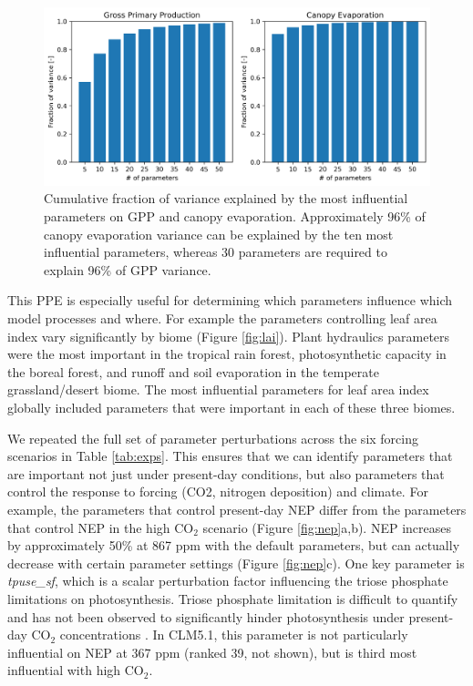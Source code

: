 \documentclass[draft]{agujournal2019}
\begin{document}
\begin{figure}[h]
\centering
\includegraphics[width=\textwidth]{../figs/variance.png}
\caption{Cumulative fraction of variance explained by the most influential parameters on GPP and canopy evaporation. Approximately 96\% of canopy evaporation variance can be explained by the ten most influential parameters, whereas 30 parameters are required to explain 96\% of GPP variance.}
\label{fig:variance}
\end{figure}

This PPE is especially useful for determining which parameters influence which model processes and where. For example the parameters controlling leaf area index vary significantly by biome (Figure \ref{fig:lai}). Plant hydraulics parameters were the most important in the tropical rain forest, photosynthetic capacity in the boreal forest, and runoff and soil evaporation in the temperate grassland/desert biome. The most influential parameters for leaf area index globally included parameters that were important in each of these three biomes. 

We repeated the full set of parameter perturbations across the six forcing scenarios in Table \ref{tab:exps}. This ensures that we can identify parameters that are important not just under present-day conditions, but also parameters that control the response to forcing (CO2, nitrogen deposition) and climate.
For example, the parameters that control present-day NEP differ  from the parameters that control NEP in the high CO$_2$ scenario (Figure \ref{fig:nep}a,b). NEP increases by approximately 50\% at 867 ppm with the default parameters, but can actually decrease with certain parameter settings (Figure \ref{fig:nep}c). One key parameter is \textit{tpuse\_sf}, which is a scalar perturbation factor influencing the triose phosphate limitations on photosynthesis. Triose phosphate limitation is difficult to quantify and has not been observed to significantly hinder photosynthesis under present-day CO$_2$ concentrations \cite{kumarathunge2019}. In CLM5.1, this parameter is not particularly influential on NEP at 367 ppm (ranked 39, not shown), but is third most influential with high CO$_2$. 
\end{document}
